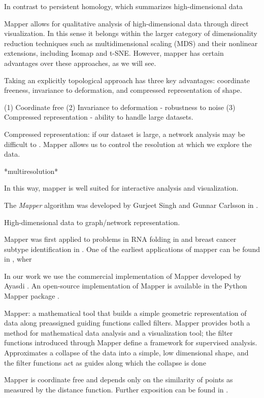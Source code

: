 In contrast to persistent homology, which summarizes high-dimensional data 

Mapper allows for qualitative analysis of high-dimensional data through direct visualization.
In this sense it belongs within the larger category of dimensionality reduction techniques such as multidimensional scaling (MDS) and their nonlinear extensions, including Isomap and t-SNE.
However, mapper has certain advantages over these approaches, as we will see.

Taking an explicitly topological approach has three key advantages: coordinate freeness, invariance to deformation, and compressed representation of shape.

(1) Coordinate free
(2) Invariance to deformation - robustness to noise
(3) Compressed representation - ability to handle large datasets.

Compressed representation: if our dataset is large, a network analysis may be difficult to .
Mapper allows us to control the resolution at which we explore the data.

*multiresolution*


In this way, mapper is well suited for interactive analysis and visualization.

The \emph{Mapper} algorithm was developed by Gurjeet Singh and Gunnar Carlsson in \cite{Singh:2007ve}.

High-dimensional data to graph/network representation.


Mapper was first applied to problems in RNA folding in \cite{Bowman:2008esa} and breast cancer subtype identification in \cite{Nicolau:2011}.
One of the earliest applications of mapper can be found in \cite{Nicolau:2011}, wher


In our work we use the commercial implementation of Mapper developed by Ayasdi \cite{AyasdiIris:2015}.
An open-source implementation of Mapper is available in the Python Mapper package \cite{Mullner:2013}.


Mapper: a mathematical tool that builds a simple geometric representation of data along preassigned guiding functions called filters. Mapper provides both a method for mathematical data analysis and a visualization tool; the filter functions introduced through Mapper define a framework for supervised analysis. Approximates a collapse of the data into a simple, low dimensional shape, and the filter functions act as guides along which the collapse is done


Mapper is coordinate free and depends only on the similarity of points as measured by the distance function.
Further exposition can be found in \cite{Lum:2013cz}.



